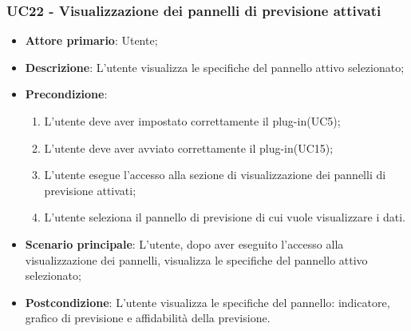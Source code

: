 \subsubsection{UC22 - Visualizzazione dei pannelli di previsione attivati}
\label{sssec:uc22}
\begin{itemize}
  \item \textbf{Attore primario}: Utente;
  \item \textbf{Descrizione}: L'utente visualizza le specifiche del pannello attivo selezionato;
  \item \textbf{Precondizione}:
  \begin{enumerate}
		\item L'utente deve aver impostato correttamente il plug-in(UC5);
		\item L'utente deve aver avviato correttamente il plug-in(UC15);
		\item L'utente esegue l'accesso alla sezione di visualizzazione dei pannelli di previsione attivati;
		\item L'utente seleziona il pannello di previsione di cui vuole visualizzare i dati.
	\end{enumerate}
  \item \textbf{Scenario principale}: L'utente, dopo aver eseguito l'accesso alla visualizzazione dei pannelli, visualizza le specifiche del pannello attivo selezionato;
  \item \textbf{Postcondizione}: L'utente visualizza le specifiche del pannello: indicatore, grafico di previsione e affidabilità della previsione.
\end{itemize}

